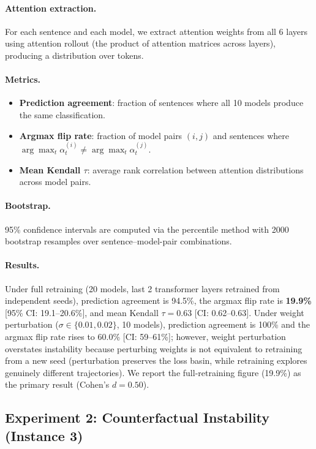 \documentclass[11pt,a4paper]{article}
\begin{document}
\paragraph{Attention extraction.}
For each sentence and each model, we extract attention weights from all 6 layers
using attention rollout (the product of attention matrices across layers),
producing a distribution over tokens.

\paragraph{Metrics.}
\begin{itemize}[nosep]
  \item \textbf{Prediction agreement}: fraction of sentences where all 10 models
    produce the same classification.
  \item \textbf{Argmax flip rate}: fraction of model pairs $(i,j)$ and sentences
    where $\arg\max_t \alpha^{(i)}_t \neq \arg\max_t \alpha^{(j)}_t$.
  \item \textbf{Mean Kendall $\tau$}: average rank correlation between attention
    distributions across model pairs.
\end{itemize}

\paragraph{Bootstrap.}
95\% confidence intervals are computed via the percentile method with 2000
bootstrap resamples over sentence--model-pair combinations.

\paragraph{Results.}
Under full retraining (20 models, last 2 transformer layers retrained from
independent seeds), prediction agreement is 94.5\%, the argmax flip rate is
\textbf{19.9\%} [95\% CI: 19.1--20.6\%], and mean Kendall $\tau = 0.63$
[CI: 0.62--0.63].  Under weight perturbation ($\sigma \in \{0.01, 0.02\}$,
10 models), prediction agreement is 100\% and the argmax flip rate rises to
60.0\% [CI: 59--61\%]; however, weight perturbation overstates instability
because perturbing weights is not equivalent to retraining from a new seed
(perturbation preserves the loss basin, while retraining explores genuinely
different trajectories).  We report the full-retraining figure (19.9\%) as
the primary result (Cohen's $d = 0.50$).

\subsection{Experiment 2: Counterfactual Instability (Instance 3)}
\label{app:exp-counterfactual}
\end{document}
